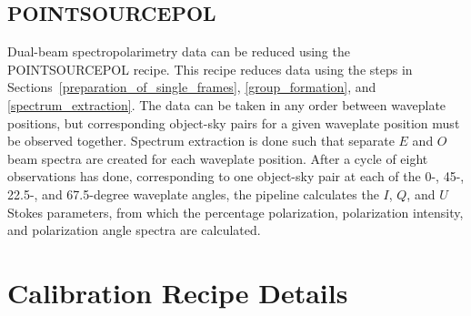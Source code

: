 \documentclass[twoside,11pt]{article}
\newcommand{\xlabel}[1]{}
\renewcommand{\_}{\texttt{\symbol{95}}}
\begin{document}
\subsection{\xlabel{point_source_pol}POINT\_SOURCE\_POL\label{point_source_pol}}

Dual-beam spectropolarimetry data can be reduced using the POINT\_SOURCE\_POL recipe. This recipe reduces data using the steps in Sections~\ref{preparation_of_single_frames}, \ref{group_formation}, and \ref{spectrum_extraction}. The data can be taken in any order between waveplate positions, but corresponding object-sky pairs for a given waveplate position must be observed together. Spectrum extraction is done such that separate $E$ and $O$ beam spectra are created for each waveplate position. After a cycle of eight observations has done, corresponding to one object-sky pair at each of the 0-, 45-, 22.5-, and 67.5-degree waveplate angles, the pipeline calculates the $I$, $Q$, and $U$ Stokes parameters, from which the percentage polarization, polarization intensity, and polarization angle spectra are calculated.

\section{\xlabel{calibration_recipe_details}Calibration Recipe Details\label{calibration_recipe_details}}
\end{document}
